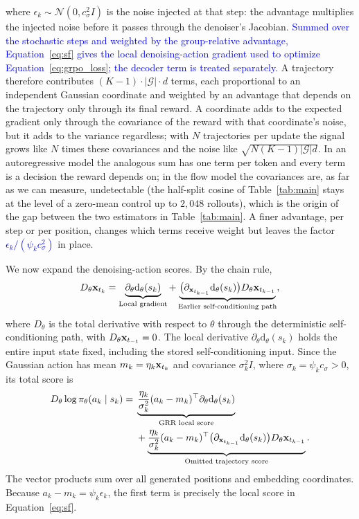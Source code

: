 where $\epsilon_k\sim\mathcal N(0,c_\sigma^2I)$ is the noise injected at that step: the advantage multiplies the injected noise before it passes through the denoiser's Jacobian. \textcolor{blue}{Summed over the stochastic steps and weighted by the group-relative advantage, Equation~\ref{eq:sf} gives the local denoising-action gradient used to optimize Equation~\ref{eq:grpo_loss}; the decoder term is treated separately.} A trajectory therefore contributes $(K-1)\cdot|\mathcal G|\cdot d$ terms, each proportional to an independent Gaussian coordinate and weighted by an advantage that depends on the trajectory only through its final reward. A coordinate adds to the expected gradient only through the covariance of the reward with that coordinate's noise, but it adds to the variance regardless; with $N$ trajectories per update the signal grows like $N$ times these covariances and the noise like $\sqrt{N(K-1)|\mathcal G|d}$. In an autoregressive model the analogous sum has one term per token and every term is a decision the reward depends on; in the flow model the covariances are, as far as we can measure, undetectable (the half-split cosine of Table~\ref{tab:main} stays at the level of a zero-mean control up to $2{,}048$ rollouts), which is the origin of the gap between the two estimators in Table~\ref{tab:main}. A finer advantage, per step or per position, changes which terms receive weight but leaves the factor \textcolor{blue}{$\epsilon_k/(\psi_kc_\sigma^2)$} in place.

\begingroup
\color{blue}
We now expand the denoising-action scores. By the chain rule,
\begin{equation}
D_\theta {\mathbf{x}}_{t_{k}}
=\underbrace{\partial_\theta\mathrm d_\theta(s_k)}_{\text{Local gradient}}
+\underbrace{\big(\partial_{{\mathbf{x}}_{t_{k-1}}}\mathrm d_\theta(s_k)\big)D_\theta {\mathbf{x}}_{t_{k-1}}}_{\text{Earlier self-conditioning path}},
\label{eq:self_conditioning_chain}
\end{equation}
where $D_\theta$ is the total derivative with respect to $\theta$ through the deterministic self-conditioning path, with $D_\theta {\mathbf{x}}_{t_{-1}}=0$. The local derivative $\partial_\theta\mathrm d_\theta(s_k)$ holds the entire input state fixed, including the stored self-conditioning input. Since the Gaussian action has mean $m_k=\eta_k {\mathbf{x}}_{t_{k}}$ and covariance $\sigma_k^2 I$, where $\sigma_k=\psi_k c_\sigma>0$, its total score is
\begin{equation}
\begin{aligned}
D_\theta\log\pi_\theta(a_k\mid s_k)
={}&\underbrace{\frac{\eta_k}{\sigma_k^2}(a_k-m_k)^\top\partial_\theta\mathrm d_\theta(s_k)}_{\text{GRR local score}}\\
&+\underbrace{\frac{\eta_k}{\sigma_k^2}(a_k-m_k)^\top
\big(\partial_{{\mathbf{x}}_{t_{k-1}}}\mathrm d_\theta(s_k)\big)D_\theta {\mathbf{x}}_{t_{k-1}}}_{\text{Omitted trajectory score}}.
\end{aligned}
\label{eq:trajectory_score_decomposition}
\end{equation}
The vector products sum over all generated positions and embedding coordinates. Because $a_k-m_k=\psi_k\epsilon_k$, the first term is precisely the local score in Equation~\ref{eq:sf}.

